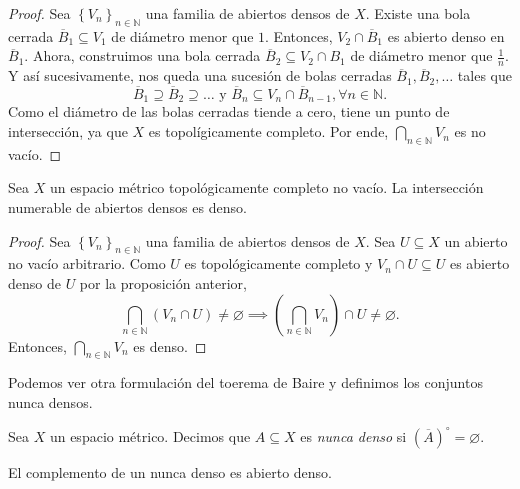 \begin{proof}
	Sea $\left\{ V_n \right\}_{n \in \mathbb{N}}$ una familia de abiertos densos de $X$. Existe una bola cerrada $\overline{B}_1 \subseteq V_1$ de diámetro menor que $1$. Entonces, $V_2 \cap \overline{B}_1$ es abierto denso en $\overline{B}_1$. Ahora, construimos una bola cerrada $\overline{B}_2 \subseteq V_2 \cap B_1$ de diámetro menor que $\frac{1}{n}$. Y así sucesivamente, nos queda una sucesión de bolas cerradas $\overline{B}_1, \overline{B}_2, \ldots$ tales que
	\begin{equation*}
		\overline{B}_1 \supseteq \overline{B}_2 \supseteq \dots \text{ y } \overline{B}_n \subseteq V_n \cap \overline{B}_{n-1}, \forall n \in \mathbb{N}.
	\end{equation*}
	Como el diámetro de las bolas cerradas tiende a cero, tiene un punto de intersección, ya que $X$ es topolígicamente completo. Por ende, $\bigcap_{n \in \mathbb{N}} V_n$ es no vacío.
\end{proof}

\begin{theorem}
	Sea $X$ un espacio métrico topológicamente completo no vacío. La intersección numerable de abiertos densos es denso.
\end{theorem}

\begin{proof}
	Sea $\left\{ V_n \right\}_{n \in \mathbb{N}}$ una familia de abiertos densos de $X$. Sea $U \subseteq X$ un abierto no vacío arbitrario. Como $U$ es topológicamente completo y $V_n \cap U \subseteq U$ es abierto denso de $U$ por la proposición anterior,
	\begin{equation*}
		\bigcap_{n \in \mathbb{N}} (V_n \cap U) \neq \varnothing \implies \left( \bigcap_{n \in \mathbb{N}} V_n  \right) \cap U \neq \varnothing.
	\end{equation*}
	Entonces, $\bigcap_{n \in \mathbb{N}} V_n$ es denso.
\end{proof}

Podemos ver otra formulación del toerema de Baire y definimos los conjuntos nunca densos.

\begin{definition}
	Sea $X$ un espacio métrico. Decimos que $A \subseteq X$ es \emph{nunca denso} si $(\overline{A})^{\circ} = \varnothing$.
\end{definition}

\begin{remark}
	El complemento de un nunca denso es abierto denso.
\end{remark}

